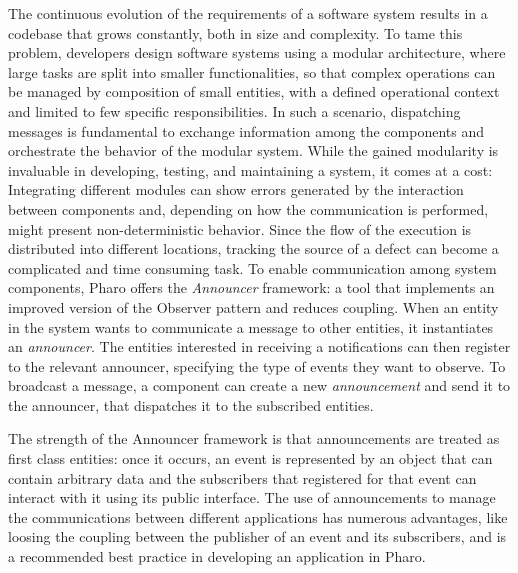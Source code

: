 The continuous evolution of the requirements of a software system results in a codebase that grows constantly, both in size and complexity. To tame this problem, developers design software systems using a modular architecture, where large tasks are split into smaller functionalities, so that complex operations can be managed by composition of small entities, with a defined operational context and limited to few specific responsibilities. In such a scenario, dispatching messages is fundamental to exchange information among the components and orchestrate the behavior of the modular system. While the gained modularity is invaluable in developing, testing, and maintaining a system, it comes at a cost: Integrating different modules can show errors generated by the interaction between components and, depending on how the communication is performed, might present non-deterministic behavior. Since the flow of the execution is distributed into different locations, tracking the source of a defect can become a complicated and time consuming task. To enable communication among system components, Pharo offers the \emph{Announcer} framework: a tool that implements an improved version of the Observer pattern and reduces coupling. When an entity in the system wants to communicate a message to other entities, it instantiates an \emph{announcer}. The entities interested in receiving a notifications can then register to the relevant announcer, specifying the type of events they want to observe. To broadcast a message, a component can create a new \emph{announcement} and send it to the announcer, that dispatches it to the subscribed entities.

The strength of the Announcer framework is that announcements are treated as first class entities: once it occurs, an event is represented by an object that can contain arbitrary data and the subscribers that registered for that event can interact with it using its public interface. The use of announcements to manage the communications between different applications has numerous advantages, like loosing the coupling between the publisher of an event and its subscribers, and is a recommended best practice in developing an application in Pharo.

